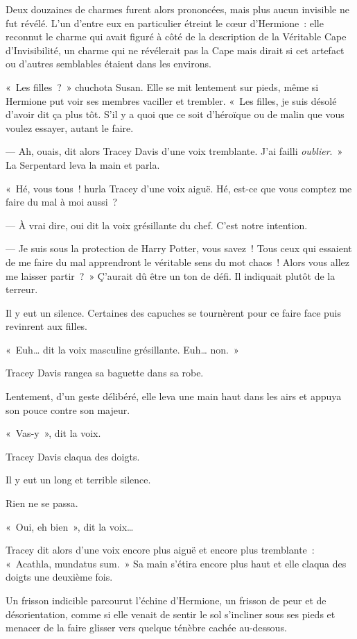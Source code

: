 Deux douzaines de charmes furent alors prononcées, mais plus aucun invisible ne fut révélé. L'un d'entre eux en particulier étreint le cœur d'Hermione~: elle reconnut le charme qui avait figuré à côté de la description de la Véritable Cape d'Invisibilité, un charme qui ne révélerait pas la Cape mais dirait si cet artefact ou d'autres semblables étaient dans les environs.

«~Les filles~?~» chuchota Susan. Elle se mit lentement sur pieds, même si Hermione put voir ses membres vaciller et trembler. «~Les filles, je suis désolé d'avoir dit ça plus tôt. S'il y a quoi que ce soit d'héroïque ou de malin que vous voulez essayer, autant le faire.

--- Ah, ouais, dit alors Tracey Davis d'une voix tremblante. J'ai failli \emph{oublier}.~» La Serpentard leva la main et parla.

«~Hé, vous tous~! hurla Tracey d'une voix aiguë. Hé, est-ce que vous comptez me faire du mal à moi aussi~?

--- À vrai dire, oui dit la voix grésillante du chef. C'est notre intention.

--- Je suis sous la protection de Harry Potter, vous savez~! Tous ceux qui essaient de me faire du mal apprendront le véritable sens du mot chaos~! Alors vous allez me laisser partir~?~» Ç'aurait dû être un ton de défi. Il indiquait plutôt de la terreur.

Il y eut un silence. Certaines des capuches se tournèrent pour ce faire face puis revinrent aux filles.

«~Euh… dit la voix masculine grésillante. Euh… non.~»

Tracey Davis rangea sa baguette dans sa robe.

Lentement, d'un geste délibéré, elle leva une main haut dans les airs et appuya son pouce contre son majeur.

«~Vas-y~», dit la voix.

Tracey Davis claqua des doigts.

Il y eut un long et terrible silence.

Rien ne se passa.

«~Oui, eh bien~», dit la voix…

Tracey dit alors d'une voix encore plus aiguë et encore plus tremblante~: «~Acathla, mundatus sum.~» Sa main s'étira encore plus haut et elle claqua des doigts une deuxième fois.

Un frisson indicible parcourut l'échine d'Hermione, un frisson de peur et de désorientation, comme si elle venait de sentir le sol s'incliner sous ses pieds et menacer de la faire glisser vers quelque ténèbre cachée au-dessous.

